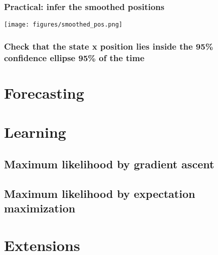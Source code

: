 \begin{frame}
    \frametitle{Practical: infer the smoothed positions}

    \begin{center}
        \texttt{[image: figures/smoothed\_pos.png]}
    \end{center}
\end{frame}

\begin{frame}
    \frametitle{Check that the state x position lies inside the 95\%
    confidence ellipse 95\% of the time}

    \begin{center}
    \end{center}

% 
% 

\end{frame}

\section{Forecasting}

\section{Learning}

\subsection{Maximum likelihood by gradient ascent}

\subsection{Maximum likelihood by expectation maximization}

\section{Extensions}

